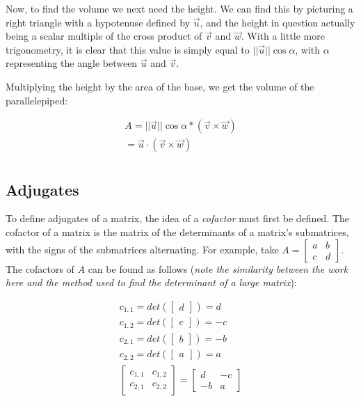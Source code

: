\documentclass[12pt]{article}
\begin{document}
{Now, to find the volume we next need the height. We can find this by picturing a right triangle with a hypotenuse defined by $\vec{u}$, and the height in question actually being a scalar multiple of the cross product of $\vec{v}$ and $\vec{w}$. With a little more trigonometry, it is clear that this value is simply equal to $||\vec{u}||\cos \alpha$, with $\alpha$ representing the angle between $\vec{u}$ and $\vec{v}$. 

Multiplying the height by the area of the base, we get the volume of the parallelepiped:

\begin{align*}
A = ||\vec{u}||\cos\alpha * (\vec{v} \times \vec{w})\\
= \vec{u}\cdot(\vec{v} \times \vec{w})\\
\end{align*}

\subsection{Adjugates}

To define adjugates of a matrix, the idea of a \textit{cofactor} must first be defined. The cofactor of a matrix is the matrix of the determinants of a matrix's submatrices, with the signs of the submatrices alternating. For example, take $A = \begin{bmatrix}
    a & b\\
    c & d
\end{bmatrix}$. The cofactors of $A$ can be found as follows (\textit{note the similarity between the work here and the method used to find the determinant of a large matrix}):

\begin{align*}
    c_{1,1} = det(\begin{bmatrix}
        d
    \end{bmatrix}) = d\\
    c_{1,2} = det(\begin{bmatrix}
        c
    \end{bmatrix}) = -c\\
    c_{2,1} = det(\begin{bmatrix}
        b
    \end{bmatrix}) = -b\\
    c_{2,2} = det(\begin{bmatrix}
        a
    \end{bmatrix}) = a\\
    \begin{bmatrix}
        c_{1,1} & c_{1,2}\\
        c_{2,1} & c_{2,2}
    \end{bmatrix} = \begin{bmatrix}
        d & -c\\
        -b & a
    \end{bmatrix}
\end{align*}

}
\end{document}
